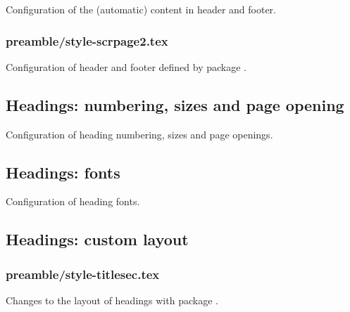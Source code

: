 Configuration of the (automatic) content in header and footer.


\subsubsection{preamble/style-scrpage2.tex}

Configuration of header and footer defined by package . 


\subsection{Headings: numbering, sizes and page opening}

Configuration of heading numbering, sizes and page openings.


\subsection{Headings: fonts}

Configuration of heading fonts.


\subsection{Headings: custom layout}


\subsubsection{preamble/style-titlesec.tex}

Changes to the layout of headings with package . 

